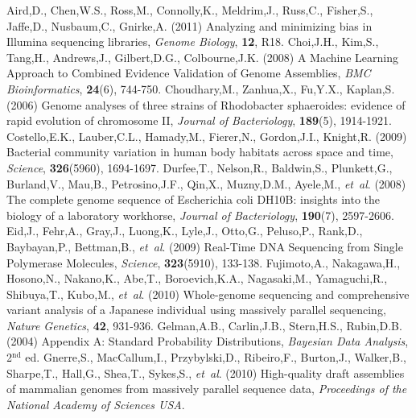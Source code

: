 \documentclass[phd,tocprelim]{cornell}
\begin{document}
\begin{thebibliography}{}


 Aird,D., Chen,W.S., Ross,M., Connolly,K., Meldrim,J., Russ,C., Fisher,S., Jaffe,D., Nusbaum,C., Gnirke,A. (2011) Analyzing and minimizing bias in Illumina sequencing libraries, {\it Genome Biology}, {\bf 12}, R18.
 Choi,J.H., Kim,S., Tang,H., Andrews,J., Gilbert,D.G., Colbourne,J.K. (2008) A Machine Learning Approach to Combined Evidence Validation of Genome Assemblies, {\it BMC Bioinformatics}, {\bf 24}(6), 744-750.
 Choudhary,M., Zanhua,X., Fu,Y.X., Kaplan,S. (2006) Genome analyses of three strains of Rhodobacter sphaeroides: evidence of rapid evolution of chromosome II, {\it Journal of Bacteriology}, {\bf 189}(5), 1914-1921.
 Costello,E.K., Lauber,C.L., Hamady,M., Fierer,N., Gordon,J.I., Knight,R. (2009) Bacterial community variation in human body habitats across space and time, {\it Science}, {\bf 326}(5960), 1694-1697.
 Durfee,T., Nelson,R., Baldwin,S., Plunkett,G., Burland,V., Mau,B., Petrosino,J.F., Qin,X., Muzny,D.M., Ayele,M., {\it et~al}. (2008) The complete genome sequence of Escherichia coli DH10B: insights into the biology of a laboratory workhorse, {\it Journal of Bacteriology}, {\bf 190}(7), 2597-2606.
 Eid,J., Fehr,A., Gray,J., Luong,K., Lyle,J., Otto,G., Peluso,P., Rank,D., Baybayan,P., Bettman,B., {\it et~al}. (2009) Real-Time DNA Sequencing from Single Polymerase Molecules, {\it Science}, {\bf 323}(5910), 133-138.
 Fujimoto,A., Nakagawa,H., Hosono,N., Nakano,K., Abe,T., Boroevich,K.A., Nagasaki,M., Yamaguchi,R., Shibuya,T., Kubo,M., {\it et~al}. (2010) Whole-genome sequencing and comprehensive variant analysis of a Japanese individual using massively parallel sequencing, {\it Nature Genetics}, {\bf 42}, 931-936.
 Gelman,A.B., Carlin,J.B., Stern,H.S., Rubin,D.B. (2004) Appendix A: Standard Probability Distributions, {\it Bayesian Data Analysis}, 2$^{\text{nd}}$ ed.
 Gnerre,S., MacCallum,I., Przybylski,D., Ribeiro,F., Burton,J., Walker,B., Sharpe,T., Hall,G., Shea,T., Sykes,S., {\it et~al}. (2010) High-quality draft assemblies of mammalian genomes from massively parallel sequence data, {\it Proceedings of the National Academy of Sciences USA}.

\end{thebibliography}
\end{document}
